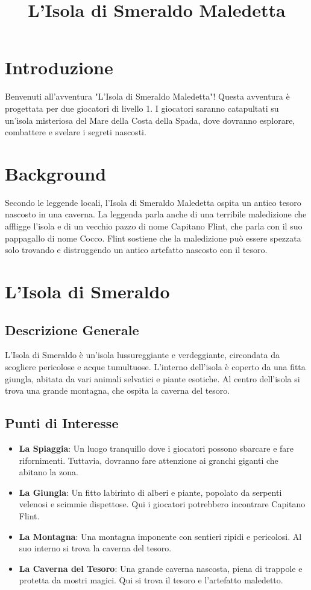 \documentclass{article}
\begin{document}
\title{L'Isola di Smeraldo Maledetta}

\section*{Introduzione}

Benvenuti all'avventura "L'Isola di Smeraldo Maledetta"! Questa avventura è progettata per due giocatori di livello 1. I giocatori saranno catapultati su un'isola misteriosa del Mare della Costa della Spada, dove dovranno esplorare, combattere e svelare i segreti nascosti.

\section*{Background}

Secondo le leggende locali, l'Isola di Smeraldo Maledetta ospita un antico tesoro nascosto in una caverna. La leggenda parla anche di una terribile maledizione che affligge l'isola e di un vecchio pazzo di nome Capitano Flint, che parla con il suo pappagallo di nome Cocco. Flint sostiene che la maledizione può essere spezzata solo trovando e distruggendo un antico artefatto nascosto con il tesoro.

\section*{L'Isola di Smeraldo}

\subsection*{Descrizione Generale}

L'Isola di Smeraldo è un'isola lussureggiante e verdeggiante, circondata da scogliere pericolose e acque tumultuose. L'interno dell'isola è coperto da una fitta giungla, abitata da vari animali selvatici e piante esotiche. Al centro dell'isola si trova una grande montagna, che ospita la caverna del tesoro.

\subsection*{Punti di Interesse}

\begin{itemize}
    \item \textbf{La Spiaggia}: Un luogo tranquillo dove i giocatori possono sbarcare e fare rifornimenti. Tuttavia, dovranno fare attenzione ai granchi giganti che abitano la zona.
    \item \textbf{La Giungla}: Un fitto labirinto di alberi e piante, popolato da serpenti velenosi e scimmie dispettose. Qui i giocatori potrebbero incontrare Capitano Flint.
    \item \textbf{La Montagna}: Una montagna imponente con sentieri ripidi e pericolosi. Al suo interno si trova la caverna del tesoro.
    \item \textbf{La Caverna del Tesoro}: Una grande caverna nascosta, piena di trappole e protetta da mostri magici. Qui si trova il tesoro e l'artefatto maledetto.
\end{itemize}
\end{document}
